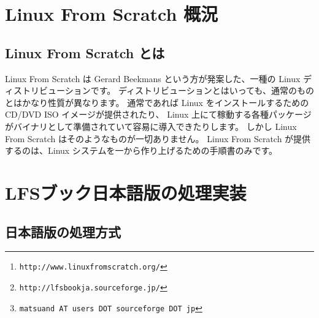 \documentclass{lfsread}
\begin{document}
\author{松 山 道 夫\thanks{\texttt{matsuand AT users DOT sourceforge DOT jp}}}
\date{2013年9月xx日}
\maketitle

\begin{abstract}
Linux From Scratch%
\footnote{\texttt{http://www.linuxfromscratch.org/}}
は、Linux を１から作り出す手順書 ``LFSブック'' を提供するプロジェクトです。
著者はそのオリジナルに対する日本語訳を構築し、SourceForge サイト%
\footnote{\texttt{http://lfsbookja.sourceforge.jp/}}
において公開しています。
本書では、LFSブックのこと、著者の利用状況などについてや、日本語訳を行う際の訳出術について、
また日本語版を生成するための処理段取りなどについて、取りとめもなく語ります。
\end{abstract}

\section{Linux From Scratch 概況}

\subsection{Linux From Scratch とは}

Linux From Scratch は Gerard Beekmans という方が発案した、一種の Linux ディストリビューションです。
ディストリビューションとはいっても、通常のものとはかなり性質が異なります。
通常であれば Linux をインストールするための CD/DVD ISO イメージが提供されたり、
Linux 上にて稼動する各種パッケージがバイナリとして準備されていて容易に導入できたりします。
しかし Linux From Scratch はそのようなものが一切ありません。
Linux From Scratch が提供するのは、Linux システムを一から作り上げるための手順書のみです。




\section{LFSブック日本語版の処理実装}

\subsection{日本語版の処理方式}
\end{document}

